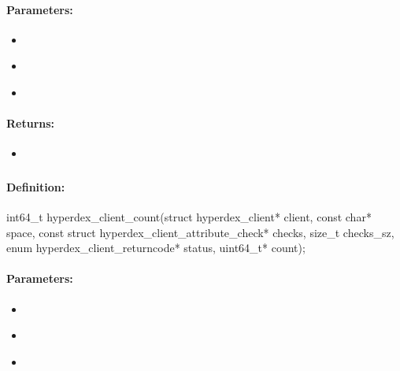 \paragraph{Parameters:}
\begin{itemize}[noitemsep]
\item {}\\

\item {}\\

\item {}\\

\end{itemize}

\paragraph{Returns:}
\begin{itemize}[noitemsep]
\item {}\\

\end{itemize}

\pagebreak
\subsubsection{}
\label{api:c:count}


\paragraph{Definition:}
\begin{ccode}
int64_t hyperdex_client_count(struct hyperdex_client* client,
        const char* space,
        const struct hyperdex_client_attribute_check* checks, size_t checks_sz,
        enum hyperdex_client_returncode* status,
        uint64_t* count);
\end{ccode}

\paragraph{Parameters:}
\begin{itemize}[noitemsep]
\item {}\\

\item {}\\

\item {}\\

\end{itemize}

